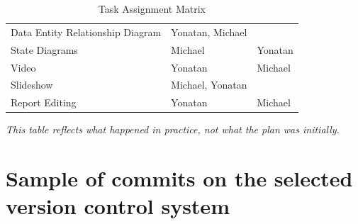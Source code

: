 \documentclass[11pt]{article}
\begin{document}
\begin{table}[H]
\begin{tabular}{lll}
            Data Entity Relationship Diagram   & Yonatan, Michael    &                  \\
            State Diagrams                     & Michael             & Yonatan          \\
            Video                              & Yonatan             & Michael          \\
            Slideshow                          & Michael, Yonatan    &                  \\
            Report Editing                     & Yonatan             & Michael          \\
            \bottomrule
        \end{tabular}
        \caption{Task Assignment Matrix}\label{tab:table}
    \end{table}

    \textsl{This table reflects what happened in practice, not what the plan was initially.}

    \begin{figure}
        \label{fig:Gant Chart} %
    \end{figure}
    \pagebreak


    \section{Sample of commits on the selected version control system}



    \pagebreak


%
%
\end{document}
